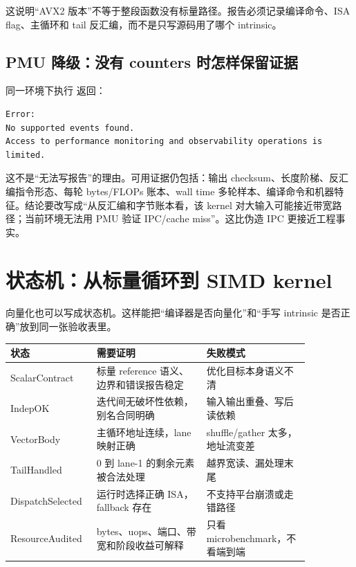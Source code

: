 这说明“AVX2 版本”不等于整段函数没有标量路径。报告必须记录编译命令、ISA flag、主循环和 tail 反汇编，而不是只写源码用了哪个 intrinsic。

\subsection{PMU 降级：没有 counters 时怎样保留证据}

同一环境下执行  返回：

\begin{lstlisting}[numbers=none,caption={perf 不可用时的报告方式}]
Error:
No supported events found.
Access to performance monitoring and observability operations is limited.
\end{lstlisting}

这不是“无法写报告”的理由。可用证据仍包括：输出 checksum、长度阶梯、反汇编指令形态、每轮 bytes/FLOPs 账本、wall time 多轮样本、编译命令和机器特征。结论要改写成“从反汇编和字节账本看，该 kernel 对大输入可能接近带宽路径；当前环境无法用 PMU 验证 IPC/cache miss”。这比伪造 IPC 更接近工程事实。

\section{状态机：从标量循环到 SIMD kernel}

向量化也可以写成状态机。这样能把“编译器是否向量化”和“手写 intrinsic 是否正确”放到同一张验收表里。

\begin{center}
\begin{tabular}{p{0.20\linewidth}p{0.34\linewidth}p{0.32\linewidth}}
\toprule
状态 & 需要证明 & 失败模式 \\
\midrule
ScalarContract & 标量 reference 语义、边界和错误报告稳定 & 优化目标本身语义不清 \\
IndepOK & 迭代间无破坏性依赖，别名合同明确 & 输入输出重叠、写后读依赖 \\
VectorBody & 主循环地址连续，lane 映射正确 & shuffle/gather 太多，地址流变差 \\
TailHandled & 0 到 lane-1 的剩余元素被合法处理 & 越界宽读、漏处理末尾 \\
DispatchSelected & 运行时选择正确 ISA，fallback 存在 & 不支持平台崩溃或走错路径 \\
ResourceAudited & bytes、uops、端口、带宽和阶段收益可解释 & 只看 microbenchmark，不看端到端 \\
\bottomrule
\end{tabular}
\end{center}

